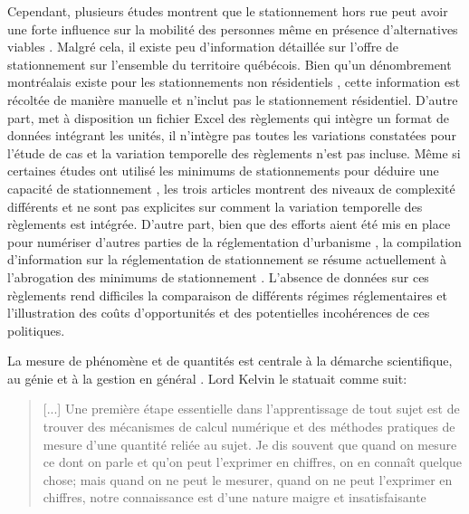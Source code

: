   
    Cependant, plusieurs études montrent que le stationnement hors rue peut avoir une forte influence sur la mobilité des personnes même en présence d'alternatives viables \parencite{guo_does_2013,currans_households_2023,weinberger_residential_2009}. Malgré cela, il existe peu d'information détaillée sur l'offre de stationnement sur l'ensemble du territoire québécois. Bien qu'un dénombrement montréalais existe pour les stationnements non résidentiels \parencite{consortium_cima_-_daniel_arbour_et_associes_inventaire_1998,aignel_elaboration_2015}, cette information est récoltée de manière manuelle et n'inclut pas le stationnement résidentiel. D'autre part, \textcite{chester_inventorying_2022} met à disposition un fichier Excel des règlements qui intègre un format de données\parencite{li_sfba_2022} intégrant les unités, il n'intègre pas toutes les variations constatées pour l'étude de cas et la variation temporelle des règlements n'est pas incluse. Même si certaines études ont utilisé les minimums de stationnements pour déduire une capacité de stationnement \parencite{chester_parking_2015,chester_inventorying_2022,hoehne_valley_2019}, les trois articles montrent des niveaux de complexité différents et ne sont pas explicites sur comment la variation temporelle des règlements est intégrée. D'autre part, bien que des efforts aient été mis en place pour numériser d'autres parties de la réglementation d'urbanisme \parencite{xu_national_2023}, la compilation d'information sur la réglementation de stationnement se résume actuellement à l'abrogation des minimums de stationnement \parencite{parking_reform_network_parking_2025,bronin_how_2023}. L'absence de données sur ces règlements rend difficiles la comparaison de différents régimes réglementaires et l'illustration des coûts d'opportunités et des potentielles incohérences de ces politiques.\par
    La mesure de phénomène et de quantités est centrale à la démarche scientifique, au génie et à la gestion en général \parencite{kelvin_popular_1891,taylor_principles_1911,dolence_using_2015}. Lord Kelvin le statuait comme suit:
    \begin{quote}
        [...] Une première étape essentielle dans l'apprentissage de tout sujet est de trouver des mécanismes de calcul numérique et des méthodes pratiques de mesure d'une quantité reliée au sujet. Je dis souvent que quand on mesure ce dont on parle et qu'on peut l'exprimer en chiffres, on en connaît quelque chose; mais quand on ne peut le mesurer, quand on ne peut l'exprimer en chiffres, notre connaissance est d'une nature maigre et insatisfaisante
    \end{quote}
